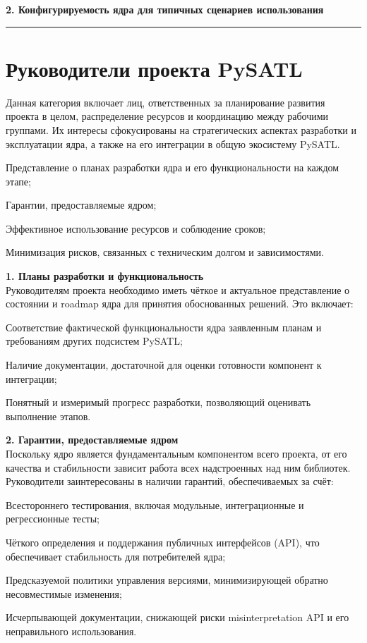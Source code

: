 \textbf{2.  Конфигурируемость ядра для типичных сценариев использования}\\

\noindent\rule{\textwidth}{0.5pt}
\section{Руководители проекта PySATL}

Данная категория включает лиц, ответственных за планирование развития проекта в целом, распределение ресурсов и координацию между рабочими группами. Их интересы сфокусированы на стратегических аспектах разработки и эксплуатации ядра, а также на его интеграции в общую экосистему PySATL.

\begin{itemizecmp}
    \item Представление о планах разработки ядра и его функциональности на каждом этапе;
    \item Гарантии, предоставляемые ядром;
    \item Эффективное использование ресурсов и соблюдение сроков;
    \item Минимизация рисков, связанных с техническим долгом и зависимостями.
\end{itemizecmp}

\textbf{1. Планы разработки и функциональность} \\
Руководителям проекта необходимо иметь чёткое и актуальное представление о состоянии и roadmap ядра для принятия обоснованных решений. Это включает:
\begin{itemizecmp}
    \item Соответствие фактической функциональности ядра заявленным планам и требованиям других подсистем PySATL;
    \item Наличие документации, достаточной для оценки готовности компонент к интеграции;
    \item Понятный и измеримый прогресс разработки, позволяющий оценивать выполнение этапов.
\end{itemizecmp}

\textbf{2. Гарантии, предоставляемые ядром} \\
Поскольку ядро является фундаментальным компонентом всего проекта, от его качества и стабильности зависит работа всех надстроенных над ним библиотек. Руководители заинтересованы в наличии гарантий, обеспечиваемых за счёт:
\begin{itemizecmp}
    \item Всестороннего тестирования, включая модульные, интеграционные и регрессионные тесты;
    \item Чёткого определения и поддержания публичных интерфейсов (API), что обеспечивает стабильность для потребителей ядра;
    \item Предсказуемой политики управления версиями, минимизирующей обратно несовместимые изменения;
    \item Исчерпывающей документации, снижающей риски misinterpretation API и его неправильного использования.
\end{itemizecmp}

